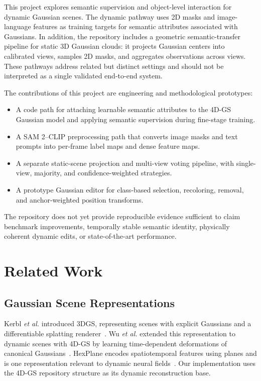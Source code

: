 \documentclass[conference]{IEEEtran}
\begin{document}
This project explores semantic supervision and object-level interaction for dynamic Gaussian scenes. The dynamic pathway uses 2D masks and image-language features as training targets for semantic attributes associated with Gaussians. In addition, the repository includes a geometric semantic-transfer pipeline for static 3D Gaussian clouds: it projects Gaussian centers into calibrated views, samples 2D masks, and aggregates observations across views. These pathways address related but distinct settings and should not be interpreted as a single validated end-to-end system.

The contributions of this project are engineering and methodological prototypes:
\begin{itemize}
    \item A code path for attaching learnable semantic attributes to the 4D-GS Gaussian model and applying semantic supervision during fine-stage training.
    \item A SAM 2--CLIP preprocessing path that converts image masks and text prompts into per-frame label maps and dense feature maps.
    \item A separate static-scene projection and multi-view voting pipeline, with single-view, majority, and confidence-weighted strategies.
    \item A prototype Gaussian editor for class-based selection, recoloring, removal, and anchor-weighted position transforms.
\end{itemize}
The repository does not yet provide reproducible evidence sufficient to claim benchmark improvements, temporally stable semantic identity, physically coherent dynamic edits, or state-of-the-art performance.

\section{Related Work}
\subsection{Gaussian Scene Representations}
Kerbl \emph{et al.} introduced 3DGS, representing scenes with explicit Gaussians and a differentiable splatting renderer~\cite{kerbl2023gs}. Wu \emph{et al.} extended this representation to dynamic scenes with 4D-GS by learning time-dependent deformations of canonical Gaussians~\cite{wu20244dgs}. HexPlane encodes spatiotemporal features using planes and is one representation relevant to dynamic neural fields~\cite{wang2023hexplane}. Our implementation uses the 4D-GS repository structure as its dynamic reconstruction base.
\end{document}
